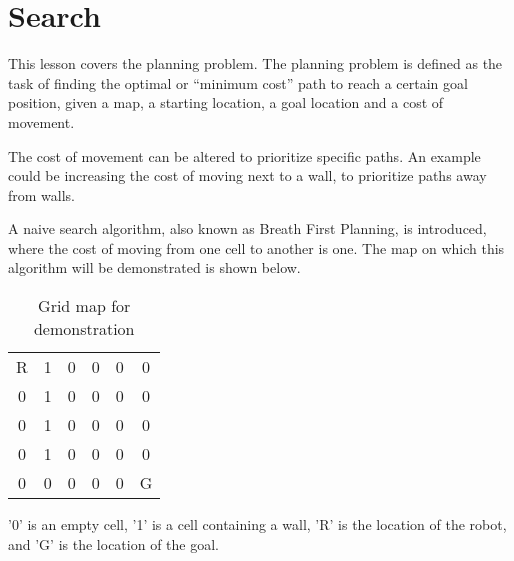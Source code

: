 \documentclass[Main]{subfiles}
\begin{document}
\section{Search} %
	\label{sec:search}

This lesson covers the planning problem. 
The planning problem is defined as the task of finding the optimal or “minimum cost” path to reach a certain goal position, given a map, a starting location, a goal location and a cost of movement.

The cost of movement can be altered to prioritize specific paths. 
An example could be increasing the cost of moving next to a wall, to prioritize paths away from walls. 

A naive search algorithm, also known as Breath First Planning, is introduced, where the cost of moving from one cell to another is one. 
The map on which this algorithm will be demonstrated is shown below.
\begin{table}[H]
	\centering
	\begin{tabular}{cccccc}
		R & 1 & 0 & 0 & 0 & 0  \\ 
		0 & 1 & 0 & 0 & 0 & 0  \\ 
		0 & 1 & 0 & 0 & 0 & 0  \\ 
		0 & 1 & 0 & 0 & 0 & 0  \\  
		0 & 0 & 0 & 0 & 0 & G  \\ 
	\end{tabular}
\caption{Grid map for demonstration}
\label{table:grid_map} 
\end{table} \noindent
'0' is an empty cell, '1' is a cell containing a wall, 'R' is the location of the robot, and 'G' is the location of the goal.
\end{document}
